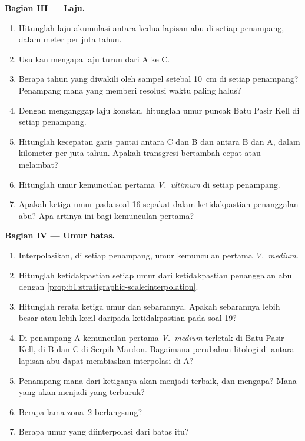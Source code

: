 \begin{problem}
\noindent\textbf{Bagian III --- Laju.}
\begin{enumerate}[resume]
  \item Hitunglah laju akumulasi antara kedua lapisan abu di setiap penampang, dalam meter per juta tahun.
  \item Usulkan mengapa laju turun dari A ke C.
  \item Berapa tahun yang diwakili oleh sampel setebal \qty{10}{cm} di setiap penampang? Penampang mana yang memberi resolusi waktu paling halus?
  \item Dengan menganggap laju konstan, hitunglah umur puncak Batu Pasir Kell di setiap penampang.
  \item Hitunglah kecepatan garis pantai antara C dan B dan antara B dan A, dalam kilometer per juta tahun. Apakah transgresi bertambah cepat atau melambat?
  \item Hitunglah umur kemunculan pertama \emph{V.~ultimum} di setiap penampang.
  \item Apakah ketiga umur pada soal 16 sepakat dalam ketidakpastian penanggalan abu? Apa artinya ini bagi kemunculan pertama?
\end{enumerate}

\noindent\textbf{Bagian IV --- Umur batas.}
\begin{enumerate}[resume]
  \item Interpolasikan, di setiap penampang, umur kemunculan pertama \emph{V.~medium}.
  \item Hitunglah ketidakpastian setiap umur dari ketidakpastian penanggalan abu dengan \cref{prop:b1:stratigraphic-scale:interpolation}.
  \item Hitunglah rerata ketiga umur dan sebarannya. Apakah sebarannya lebih besar atau lebih kecil daripada ketidakpastian pada soal 19?
  \item Di penampang A kemunculan pertama \emph{V.~medium} terletak di Batu Pasir Kell, di B dan C di Serpih Mardon. Bagaimana perubahan litologi di antara lapisan abu dapat membiaskan interpolasi di A?
  \item Penampang mana dari ketiganya akan menjadi  terbaik, dan mengapa? Mana yang akan menjadi yang terburuk?
  \item Berapa lama zona~2 berlangsung?
  \item Berapa umur yang diinterpolasi dari batas itu?
\end{enumerate}
\end{problem}
